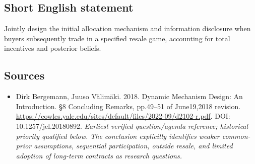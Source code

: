 \documentclass[11pt]{article}
\begin{document}
\subsection{Short English statement}
Jointly design the initial allocation mechanism and information disclosure when buyers subsequently trade in a specified resale game, accounting for total incentives and posterior beliefs.

\subsection{Sources}
\begin{itemize}\raggedright
\item[\textnormal{[S1]}]\hypertarget{source:30007574:1}{} Dirk Bergemann, Juuso Välimäki. 2018. Dynamic Mechanism Design: An Introduction. §8 Concluding Remarks, pp.49–51 of June19,2018 revision.
\url{https://cowles.yale.edu/sites/default/files/2022-09/d2102-r.pdf}.
DOI: 10.1257/jel.20180892.
{\small\textit{Earliest verified question/agenda reference; historical priority qualified below. The conclusion explicitly identifies weaker common-prior assumptions, sequential participation, outside resale, and limited adoption of long-term contracts as research questions.}}
\end{itemize}
\end{document}
